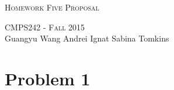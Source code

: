 \documentclass{article}
\begin{document}
\begin{center}
\Huge{\textsc{Homework Five Proposal}} 

\Large\textsc{CMPS242 - Fall 2015}\\

\large{Guangyu Wang \hfill Andrei Ignat  \hfill Sabina Tomkins} 
\end{center}

\section{Problem 1}
\end{document}
